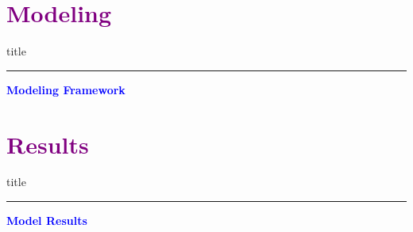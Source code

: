 \documentclass[aspectratio=169]{beamer}
\begin{document}
\section{\textbf{\textcolor{purple}{Modeling}}}
    \begin{frame}[plain]
        \vfill
      \centering
      \begin{beamercolorbox}[sep=8pt,center,shadow=true,rounded=true]{title}
        \insertsectionhead\par%
        \color{oxfordblue}\noindent\rule{10cm}{1pt}
      \end{beamercolorbox}
      \vfill
  \end{frame}


\begin{frame}{\textcolor{blue}{\textbf{Modeling Framework}}}
    
\end{frame}


\section{\textbf{\textcolor{purple}{Results}}}
    \begin{frame}[plain]
        \vfill
      \centering
      \begin{beamercolorbox}[sep=8pt,center,shadow=true,rounded=true]{title}
        \insertsectionhead\par%
        \color{oxfordblue}\noindent\rule{10cm}{1pt}
      \end{beamercolorbox}
      \vfill
  \end{frame}


\begin{frame}{\textcolor{blue}{\textbf{Model Results}}}
    
\end{frame}


\end{document}
